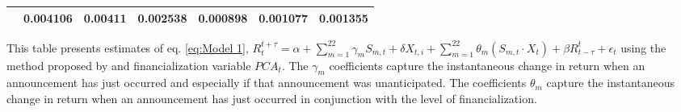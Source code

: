 \begin{sidewaystable}
{\begin{tabular}{@{}lllllllllllll@{}}
&\multicolumn{2}{c}{ 0.004106 }                                                 & \multicolumn{2}{c}{ 0.00411 }                                                 & \multicolumn{2}{c}{ 0.002538 }                                                 & \multicolumn{2}{c}{ 0.000898 }                                                 & \multicolumn{2}{c}{ 0.001077 }                                                   & \multicolumn{2}{c}{ 0.001355 }                                                 \\ \bottomrule 
\end{tabular}
}
\begin{tablenotes}\item 
    \singlespacing
    \footnotesize
    This table presents estimates of eq. \ref{eq:Model 1}, $R_{t}^{t+\tau}=\alpha+\sum_{m=1}^{22} \gamma_m S_{m,t}+ \delta X_{t,i} + \sum_{m=1}^{22} \theta_m (S_{m,t} \cdot X_t)+\beta R_{t-\tau}^{t}+\epsilon_{t}$ using the method proposed by \citet{kurov2019price} and financialization variable $PCA_t$. The $\gamma_m$ coefficients capture the instantaneous change in return when an announcement has just occurred and especially if that announcement was unanticipated. The coefficients $\theta_m$ capture the instantaneous change in return when an announcement has just occurred in conjunction with the level of financialization.
\end{tablenotes}
\end{sidewaystable}

